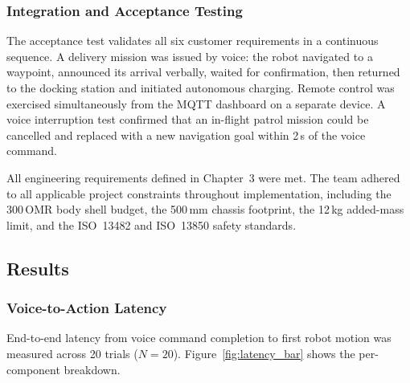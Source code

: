 \subsubsection{Integration and Acceptance Testing}

The acceptance test validates all six customer requirements in a continuous sequence. A delivery mission was issued by voice: the robot navigated to a waypoint, announced its arrival verbally, waited for confirmation, then returned to the docking station and initiated autonomous charging. Remote control was exercised simultaneously from the MQTT dashboard on a separate device. A voice interruption test confirmed that an in-flight patrol mission could be cancelled and replaced with a new navigation goal within 2\,s of the voice command.

All engineering requirements defined in Chapter~3 were met. The team adhered to all applicable project constraints throughout implementation, including the 300\,OMR body shell budget, the 500\,mm chassis footprint, the 12\,kg added-mass limit, and the ISO~13482 and ISO~13850 safety standards.

\subsection{Results}
\label{sec:results}

\subsubsection{Voice-to-Action Latency}

End-to-end latency from voice command completion to first robot motion was measured across 20 trials ($N=20$). Figure~\ref{fig:latency_bar} shows the per-component breakdown.

